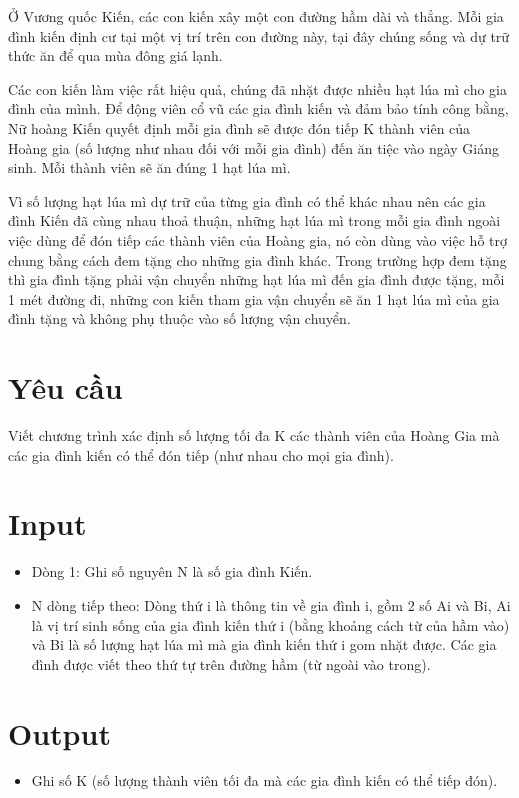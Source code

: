



   Ở Vương quốc Kiến, các con kiến xây một con đường hầm dài và thẳng. Mỗi gia đình kiến định cư tại một vị trí trên con đường này, tại đây chúng sống và dự trữ thức ăn để qua mùa đông giá lạnh.  

   Các con kiến làm việc rất hiệu quả, chúng đã nhặt được nhiều hạt lúa mì cho gia đình của mình. Để động viên cổ vũ các gia đình kiến và đảm bảo tính công bằng, Nữ hoàng Kiến quyết định mỗi gia đình sẽ được đón tiếp K thành viên của Hoàng gia (số lượng như nhau đối với mỗi gia đình) đến ăn tiệc vào ngày Giáng sinh. Mỗi thành viên sẽ ăn đúng 1 hạt lúa mì.  

   Vì số lượng hạt lúa mì dự trữ của từng gia đình có thể khác nhau nên các gia đình Kiến đã cùng nhau thoả thuận, những hạt lúa mì trong mỗi gia đình ngoài việc dùng để đón tiếp các thành viên của Hoàng gia, nó còn dùng vào việc hỗ trợ chung bằng cách đem tặng cho những gia đình khác. Trong trường hợp đem tặng thì gia đình tặng phải vận chuyển những hạt lúa mì đến gia đình được tặng, mỗi 1 mét đường đi, những con kiến tham gia vận chuyển sẽ ăn 1 hạt lúa mì của gia đình tặng và không phụ thuộc vào số lượng vận chuyển.  



\section{   Yêu cầu  }

   Viết chương trình xác định số lượng tối đa K các thành viên của Hoàng Gia mà các gia đình kiến có thể đón tiếp (như nhau cho mọi gia đình).  

\section{   Input  }
\begin{itemize}
	\item     Dòng 1: Ghi số nguyên N là số gia đình Kiến.   
	\item     N dòng tiếp theo: Dòng thứ i là thông tin về gia đình i, gồm 2 số Ai và Bi, Ai là vị trí sinh sống của gia đình kiến thứ i (bằng khoảng cách từ của hầm vào) và Bi là số lượng hạt lúa mì mà gia đình kiến thứ i gom nhặt được. Các gia đình được viết theo thứ tự trên đường hầm (từ ngoài vào trong).   
\end{itemize}

\section{   Output  }
\begin{itemize}
	\item     Ghi số K (số lượng thành viên tối đa mà các gia đình kiến có thể tiếp đón).   
\end{itemize}

